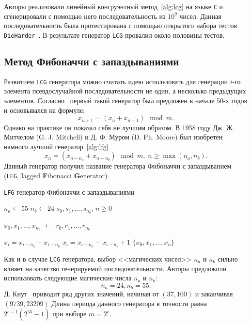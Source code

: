 \documentclass[%
floatfix,
showkeys,
nofootinbib, %
superscriptaddress, %
]{revtex4-1}
\begin{document}
Авторы реализовали линейный конгруэнтный метод~\ref{alg:lcg} на языке
\texttt{C} и сгенерировали с помощью него последовательность из
$10^{9}$ чисел. Данная последовательность была протестирована с
помощью открытого набора тестов
\texttt{DieHarder}~\cite{L_DieHarder:2013}. В результате генератор
\texttt{LCG} провалил около половины тестов.

\subsection{Метод Фибоначчи с запаздываниями}

Развитием \texttt{LCG} генератора можно считать идею использовать для
генерации $i$-го элемента псевдослучайной последовательности не один,
а несколько предыдущих элементов. Согласно~\cite{L_DKnuth:2004:ru} первый такой генератор был предложен в начале 50-х
годов и основывался на формуле:
\[
        x_{n+1} = (x_{n} + x_{n-1}) \mod m.
\]
Однако на практике он показал себя не лучшим образом. В 1958 году
Дж. Ж. Митчелом (G. J. Mitchell) и Д. Ф. Муром (D. Ph. Moore) был
изобретен намного лучший генератор~\ref{alg:lfg}
\[
        x_{n} = (x_{n-n_{a}} + x_{n - n_{b}}) \mod m,\; n \geqslant \max(n_a, n_b).
\]
Данный генератор получил название генератора Фибоначчи с запаздыванием
(\texttt{LFG}, \textbf{l}agged \textbf{F}ibonacci \textbf{G}enerator).

\begin{algorithm}[H]
  \caption{\texttt{LFG} генератор Фибоначчи с запаздываниями}\label{alg:lfg}
  \begin{algorithmic}
    \State $n_{a} \leftarrow 55$
    \State $n_{b} \leftarrow 24$
    \Require $s_0, s_1,\ldots,s_{n_{b}}$, $n\geqslant  0$
    
    \State $x_{0},x_{1},\ldots,x_{n_{b}}$ $\leftarrow$ $r_0, r_1,\ldots,r_{n_{b}}$
    
        \State $x_{i} = x_{i-n_a} - x_{i-n_b}$
        \State $x_i = x_{i-n_a} - x_{i-n_b} + 1$
      \EndIf
    \EndFor
    \State \Return $\{x_{0},x_{1},\ldots,x_{n}\}$
  \end{algorithmic}
\end{algorithm}

Как и в случае \texttt{LCG} генератора, выбор <<магических чисел>>
$n_a$ и $n_b$ сильно влияет на качество генерируемой
последовательности. Авторы предложили использовать следующие
магические числа $n_a$ и $n_b$:
\[
        n_a = 24, n_b = 55.
\]
Д. Кнут~\cite{L_DKnuth:2004:ru, L_DKnuth:1997:en} приводит ряд других
значений, начиная от $(37, 100)$ и заканчивая $(9739, 23209)$ Длина
периода данного генератора в точности равна $2^{e-1}(2^{55} - 1)$ при
выборе $m = 2^e$.
\end{document}

